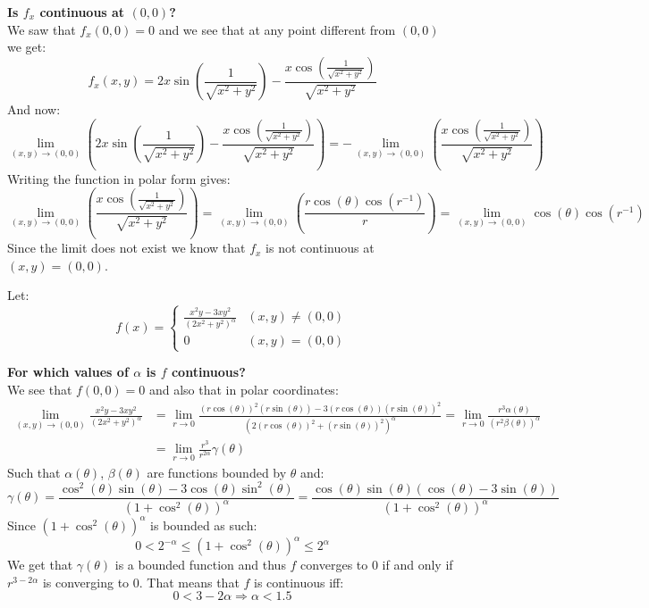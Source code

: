 \documentclass{article}
\theoremstyle{plain}
\begin{document}
	\textbf{Is $f_x$ continuous at $(0,0)$?} \\
	We saw that $f_x(0,0) = 0$ and we see that at any point different
	from $(0,0)$ we get:
	\[
		f_x(x,y) = 2x\sin\left(\dfrac{1}{\sqrt{x^2+y^2}}\right)-
		\dfrac{x\cos\left(\frac{1}{\sqrt{x^2+y^2}}\right)}
		{\sqrt{x^2+y^2}}
	\]
	And now:
	\[
		\lim_{(x,y)\to(0,0)}{\left(2x\sin\left(\dfrac{1}{\sqrt{x^2+y^2}}\right)-\dfrac{x\cos\left(\frac{1}{\sqrt{x^2+y^2}}\right)}{\sqrt{x^2+y^2}}\right)} = 
		-\lim_{(x,y)\to(0,0)}{\left(\dfrac{x\cos\left(\frac{1}{\sqrt{x^2+y^2}}\right)}{\sqrt{x^2+y^2}}\right)}
	\]
	Writing the function in polar form gives:
	\[
		\lim_{(x,y)\to(0,0)}{\left(\dfrac{x\cos\left(\frac{1}{\sqrt{x^2+y^2}}\right)}{\sqrt{x^2+y^2}}\right)} = 
		\lim_{(x,y)\to(0,0)}{\left(\dfrac{r\cos(\theta)\cos(r^{-1})}{r}\right)} = 
		\lim_{(x,y)\to(0,0)}{\cos(\theta)\cos(r^{-1})}
	\]
	Since the limit does not exist we know that $f_x$ is not continuous
	at $(x,y) = (0,0)$.
	
	\newpage
	
	Let:
	\[
		f(x) = 
		\begin{cases}
			\frac{x^2y-3xy^2}{(2x^2+y^2)^\alpha} & (x,y) \neq (0,0) \\
			0 & (x,y) = (0,0)
		\end{cases}
	\]
	
	\textbf{For which values of $\alpha$ is $f$ continuous?} \\
	We see that $f(0,0) = 0$ and also that in polar coordinates:
	\begin{align*}
		\lim_{(x,y)\to (0,0)}
		{\frac{x^2y-3xy^2}{(2x^2+y^2)^\alpha}} &= 
		\lim_{r\to 0}
		{\frac{(r\cos(\theta))^2(r\sin(\theta))-3(r\cos(\theta))
		(r\sin(\theta))^2}{(2(r\cos(\theta))^2+(r\sin(\theta))^2)^\alpha}} = 
		\lim_{r\to 0}
		{\frac{r^3 \alpha(\theta)}{(r^2\beta(\theta))^\alpha}} \\ &=
		\lim_{r\to 0}
		{\frac{r^3}{r^{2\alpha}}\gamma(\theta)}
	\end{align*}
	Such that $\alpha(\theta)$, $\beta(\theta)$ are functions bounded by 
	$\theta$ and:
	\[
		\gamma(\theta) = 
		\frac
		{\cos^2(\theta)\sin(\theta) - 3\cos(\theta)\sin^2(\theta)}
		{(1+\cos^2(\theta))^\alpha} = 
		\frac
		{\cos(\theta)\sin(\theta)(\cos(\theta)-3\sin(\theta))}
		{(1+\cos^2(\theta))^\alpha}
	\]
	Since $(1+\cos^2(\theta))^\alpha$ is bounded as such:
	\[
		0 < 2^{-\alpha} \le (1+\cos^2(\theta))^\alpha \le 2^\alpha 
	\]
	We get that $\gamma(\theta)$ is a bounded function and thus
	$f$ converges to $0$ if and only if $r^{3-2\alpha}$ is converging
	to $0$. That means that $f$ is continuous iff:
	\[
		0 < 3-2\alpha \Rightarrow \boxed{\alpha < 1.5}
	\]
	
\end{document}
